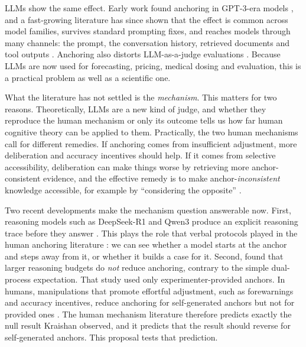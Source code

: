 \documentclass[11pt,a4paper]{article}
\begin{document}
LLMs show the same effect. Early work found anchoring in GPT-3-era models \citep{jones2022capturing,binz2023using}, and a fast-growing literature has since shown that the effect is common across model families, survives standard prompting fixes, and reaches models through many channels: the prompt, the conversation history, retrieved documents and tool outputs \citep{lou2026anchoring,huang2025understanding,borjigin2026anchorbench}. Anchoring also distorts LLM-as-a-judge evaluations \citep{kapetanovic2026anchoring}. Because LLMs are now used for forecasting, pricing, medical dosing and evaluation, this is a practical problem as well as a scientific one.

What the literature has not settled is the \emph{mechanism}. This matters for two reasons. Theoretically, LLMs are a new kind of judge, and whether they reproduce the human mechanism or only its outcome tells us how far human cognitive theory can be applied to them. Practically, the two human mechanisms call for different remedies. If anchoring comes from insufficient adjustment, more deliberation and accuracy incentives should help. If it comes from selective accessibility, deliberation can make things worse by retrieving more anchor-consistent evidence, and the effective remedy is to make anchor-\emph{inconsistent} knowledge accessible, for example by ``considering the opposite'' \citep{mussweiler2000overcoming}.

Two recent developments make the mechanism question answerable now. First, reasoning models such as DeepSeek-R1 and Qwen3 produce an explicit reasoning trace before they answer \citep{guo2025deepseek,yang2025qwen3}. This plays the role that verbal protocols played in the human anchoring literature \citep{epley2001putting}: we can see whether a model starts at the anchor and steps away from it, or whether it builds a case for it. Second, \citet{kraishan2026long} found that larger reasoning budgets do \emph{not} reduce anchoring, contrary to the simple dual-process expectation. That study used only experimenter-provided anchors. In humans, manipulations that promote effortful adjustment, such as forewarnings and accuracy incentives, reduce anchoring for self-generated anchors but not for provided ones \citep{epley2001putting,epley2005effortful}. The human mechanism literature therefore predicts exactly the null result Kraishan observed, and it predicts that the result should reverse for self-generated anchors. This proposal tests that prediction.
\end{document}
